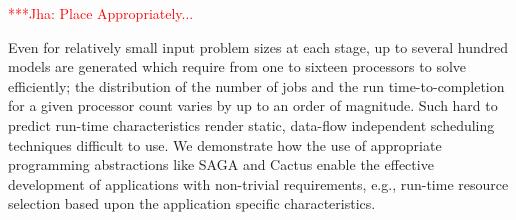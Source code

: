 \documentclass[conference,final]{IEEEtran}
\newcommand{\jhanote}[1]{ {\textcolor{red} { ***Jha: #1 }}}
\newcommand{\jhanote}[1]{}
\begin{document}
\jhanote{Place Appropriately...}

Even for relatively small input problem sizes at each stage, up to
several hundred models are generated which require from one to sixteen
processors to solve efficiently; the distribution of the number of
jobs and the run time-to-completion for a given processor count varies
by up to an order of magnitude.  Such hard to predict run-time
characteristics render static, data-flow independent scheduling
techniques difficult to use.  We demonstrate how the use of
appropriate programming abstractions like SAGA and Cactus enable the
effective development of applications with non-trivial requirements,
e.g., run-time resource selection based upon the application specific
characteristics.



\end{document}
